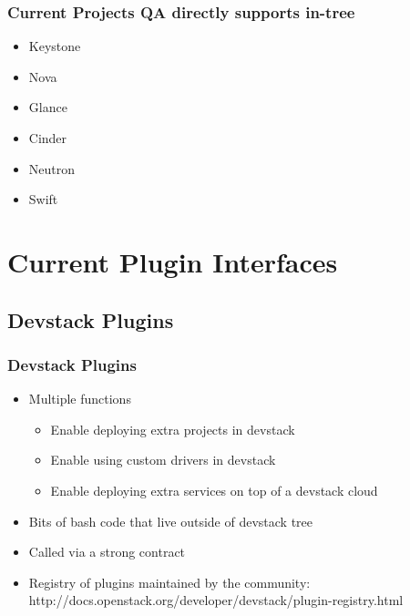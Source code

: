 \documentclass[aspectratio=169,11pt,hyperref={colorlinks=true}]{beamer}
\begin{document}
\begin{frame}
    \frametitle{Current Projects QA directly supports in-tree}
    \begin{itemize}
        \item Keystone
        \item Nova
        \item Glance
        \item Cinder
        \item Neutron
        \item Swift
    \end{itemize}
\end{frame}

\section{Current Plugin Interfaces}
\subsection{Devstack Plugins}
\begin{frame}
	\frametitle{Devstack Plugins}

    \begin{itemize}
        \item{Multiple functions}
        \begin{itemize}
            \item{Enable deploying extra projects in devstack}
            \item{Enable using custom drivers in devstack}
            \item{Enable deploying extra services on top of a devstack cloud}
        \end{itemize}
    \end{itemize}

    \begin{itemize}
        \item Bits of bash code that live outside of devstack tree
        \item Called via a strong contract
        \item Registry of plugins maintained by the community: \hfill
        \\ http://docs.openstack.org/developer/devstack/plugin-registry.html
    \end{itemize}
\end{frame}
\end{document}
